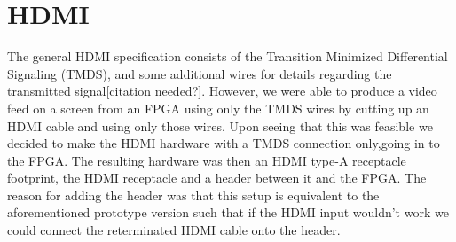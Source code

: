 \documentclass[../main/report.tex]{subfiles}
\begin{document}
\section{HDMI}

The general HDMI specification consists of the Transition Minimized Differential Signaling (TMDS), and some additional wires for details regarding the transmitted signal[citation needed?].
However, we were able to produce a video feed on a screen from an FPGA using only the TMDS wires by cutting up an HDMI cable and using only those wires.
Upon seeing that this was feasible we decided to make the HDMI hardware with a TMDS connection only,going in to the FPGA. The resulting hardware was then an HDMI type-A receptacle footprint, the HDMI receptacle and a header between it and the FPGA.
The reason for adding the header was that this setup is equivalent to the aforementioned prototype version such that if the HDMI input wouldn't work we could connect the reterminated HDMI cable onto the header.
\end{document}
